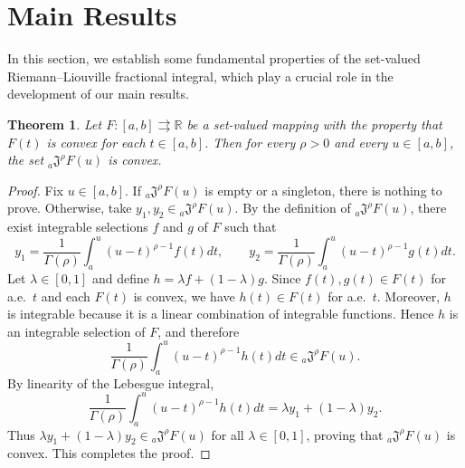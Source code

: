 \documentclass[a4paper,12pt,reqno]{amsart}
\numberwithin{equation}{section}
\newtheorem{theorem}{Theorem}[section]
\theoremstyle{definition}
\theoremstyle{remark}
\numberwithin{equation}{section}
\begin{document}

\section{Main Results}
In this section, we establish some fundamental properties of the set-valued Riemann–Liouville fractional integral, which play a crucial role in the development of our main results. 
\begin{theorem} \label{convex}
Let $F:[a,b]\rightrightarrows\mathbb{R}$ be a set-valued mapping with the property that $F(t)$ is convex for each $t\in[a,b]$.
Then for every $\rho>0$ and every $u\in[a,b]$, the set ${}_{a}\mathfrak{J}^{\rho}F(u)$ is convex.
\end{theorem}
\begin{proof}
Fix $u\in[a,b]$. If ${}_{a}\mathfrak{J}^{\rho}F(u)$ is empty or a singleton, there is nothing to prove. Otherwise, take $y_{1},y_{2}\in {}_{a}\mathfrak{J}^{\rho}F(u)$. By the definition of ${}_{a}\mathfrak{J}^{\rho}F(u)$, there exist integrable selections $f$ and $g$ of $F$ such that
$$
y_{1}=\frac{1}{\Gamma(\rho)}\int_{a}^{u}(u-t)^{\rho-1}f(t)dt,
\qquad
y_{2}=\frac{1}{\Gamma(\rho)}\int_{a}^{u}(u-t)^{\rho-1}g(t)dt.
$$
Let $\lambda\in[0,1]$ and define $h=\lambda f+(1-\lambda)g$. Since $f(t),g(t)\in F(t)$ for a.e.~$t$ and each $F(t)$ is convex, we have $h(t)\in F(t)$ for a.e.~$t$. Moreover, $h$ is integrable because it is a linear combination of integrable functions. Hence $h$ is an integrable
selection of $F$, and therefore
$$
\frac{1}{\Gamma(\rho)}\int_{a}^{u}(u-t)^{\rho-1}h(t)dt
\in {}_{a}\mathfrak{J}^{\rho}F(u).
$$
By linearity of the Lebesgue integral,
$$
\frac{1}{\Gamma(\rho)}\int_{a}^{u}(u-t)^{\rho-1}h(t)dt
=
\lambda y_{1}+(1-\lambda)y_{2}.
$$
Thus $\lambda y_{1}+(1-\lambda)y_{2}\in {}_{a}\mathfrak{J}^{\rho}F(u)$ for all $\lambda\in[0,1]$, proving that ${}_{a}\mathfrak{J}^{\rho}F(u)$ is convex. This completes the proof.
\end{proof}
\end{document}
